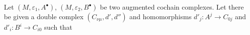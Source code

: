 Let $(M, \varepsilon_1, A^\bullet)$, $(M, \varepsilon_2, B^\bullet)$ be two augmented cochain complexes. Let there be given a double complex $(C_{\nu\mu}, d', d'')$ and homomorphisms $d'_j: A^j \rightarrow C_{0j}$ and $d'_i: B^i \rightarrow C_{i0}$ such that
